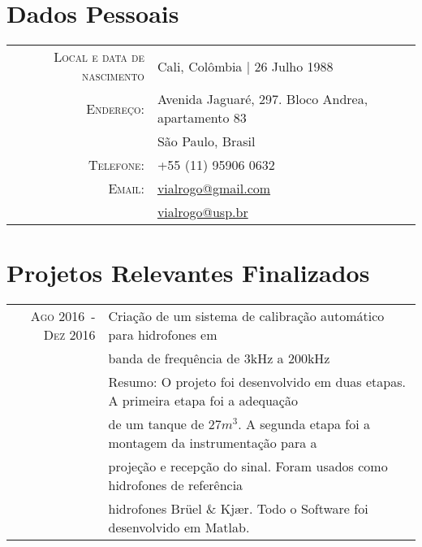 \documentclass[a4paper,10pt]{article}
\begin{document}
\pagestyle{empty} %

\par{\bigskip\par}

\section{Dados Pessoais}

\begin{longtable}{rl}
  \textsc{Local e data de nascimento}   & Cali, Colômbia  | 26 Julho 1988 \\
  \textsc{Endereço:}                    & Avenida Jaguaré, 297. Bloco Andrea, apartamento 83\\
                                        & São Paulo, Brasil\\
  \textsc{Telefone:}                    & +55 (11) 95906 0632 \\
  \textsc{Email:}                       & \href{mailto:vialrogo@gmail.com}{vialrogo@gmail.com} \\
                                        & \href{mailto:vialrogo@usp.br}{vialrogo@usp.br} \\
\end{longtable}

\section{Projetos Relevantes Finalizados}

\begin{longtable}{rl}
    \textsc{Ago 2016~-~Dez 2016}    & Criação de um sistema de calibração automático para hidrofones em \\
                                    & banda de frequência de 3kHz a 200kHz \\
                                    &\footnotesize{Resumo: O projeto foi desenvolvido em duas etapas. A primeira etapa foi a adequação}\\
                                    &\footnotesize{de um tanque de $27m^3$. A segunda etapa foi a montagem da instrumentação para a}\\
                                    &\footnotesize{projeção e recepção do sinal. Foram usados como hidrofones de referência}\\
                                    &\footnotesize{hidrofones Brüel \& Kjær. Todo o Software foi desenvolvido em Matlab.} \\
\end{longtable}
\end{document}
